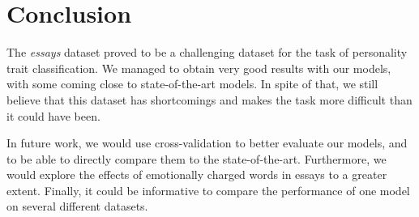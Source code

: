 \documentclass[10pt, a4paper]{article}
\begin{document}
\section{Conclusion}
The \textit{essays} dataset proved to be a challenging dataset for the task of personality trait classification. We managed to obtain very good results with our models, with some coming close to state-of-the-art models. In spite of that, we still believe that this dataset has shortcomings and makes the task more difficult than it could have been.

In future work, we would use cross-validation to better evaluate our models, and to be able to directly compare them to the state-of-the-art. Furthermore, we would explore the effects of emotionally charged words in essays to a greater extent. Finally, it could be informative to compare the performance of one model on several different datasets.
\newpage

\newpage

\newpage

 
\end{document}
